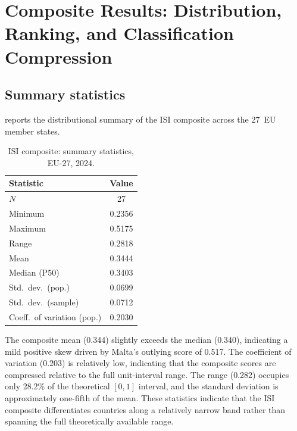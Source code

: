 \section{Composite Results: Distribution, Ranking, and Classification
  Compression}\label{sec:composite-results}

\subsection{Summary statistics}

 reports the distributional summary of the
ISI composite across the 27~EU member states.

\begin{table}[htbp]
\centering
\caption{ISI composite: summary statistics, EU-27, 2024.}
\label{tab:summary-stats}
\begin{tabular}{@{}lS[table-format=1.4]@{}}
\toprule
\textbf{Statistic} & {\textbf{Value}} \\
\midrule
$N$                         & {27} \\
Minimum                     & 0.2356 \\
Maximum                     & 0.5175 \\
Range                       & 0.2818 \\
Mean                        & 0.3444 \\
Median (P50)                & 0.3403 \\
Std.\ dev.\ (pop.)         & 0.0699 \\
Std.\ dev.\ (sample)       & 0.0712 \\
Coeff.\ of variation (pop.) & 0.2030 \\
\bottomrule
\end{tabular}
\end{table}

The composite mean (0.344) slightly exceeds the median
(0.340), indicating a mild positive skew driven by Malta's
outlying score of 0.517.  The coefficient of variation
(0.203) is relatively low, indicating that the composite scores are
compressed relative to the full unit-interval range.  The range
(0.282) occupies only 28.2\% of the theoretical $[0, 1]$
interval, and the standard deviation is approximately one-fifth of
the mean.  These statistics indicate that the ISI composite
differentiates countries along a relatively narrow band rather than
spanning the full theoretically available range.

